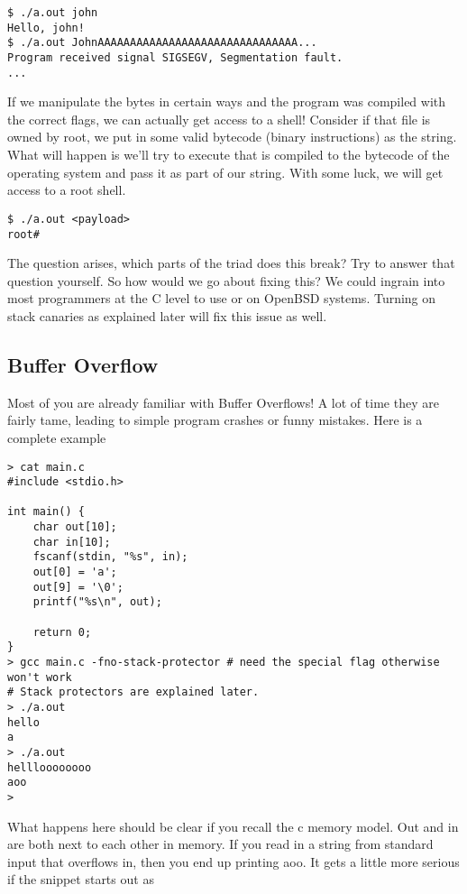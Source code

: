 \begin{lstlisting}
$ ./a.out john
Hello, john!
$ ./a.out JohnAAAAAAAAAAAAAAAAAAAAAAAAAAAAAAA...
Program received signal SIGSEGV, Segmentation fault.
...
\end{lstlisting}

If we manipulate the bytes in certain ways and the program was compiled with the correct flags, we can actually get access to a shell!
Consider if that file is owned by root, we put in some valid bytecode (binary instructions) as the string.
What will happen is we'll try to execute  that is compiled to the bytecode of the operating system and pass it as part of our string.
With some luck, we will get access to a root shell.

\begin{lstlisting}
$ ./a.out <payload>
root#
\end{lstlisting}

The question arises, which parts of the triad does this break?
Try to answer that question yourself.
So how would we go about fixing this?
We could ingrain into most programmers at the C level to use  or  on OpenBSD systems.
Turning on stack canaries as explained later will fix this issue as well.

\subsection{Buffer Overflow}

Most of you are already familiar with Buffer Overflows!
A lot of time they are fairly tame, leading to simple program crashes or funny mistakes.
Here is a complete example

\begin{lstlisting}
> cat main.c
#include <stdio.h>

int main() {
    char out[10];
    char in[10];
    fscanf(stdin, "%s", in);
    out[0] = 'a';
    out[9] = '\0';
    printf("%s\n", out);

    return 0;
}
> gcc main.c -fno-stack-protector # need the special flag otherwise won't work
# Stack protectors are explained later.
> ./a.out
hello
a
> ./a.out
hellloooooooo
aoo
>
\end{lstlisting}

What happens here should be clear if you recall the c memory model.
Out and in are both next to each other in memory.
If you read in a string from standard input that overflows in, then you end up printing aoo.
It gets a little more serious if the snippet starts out as

